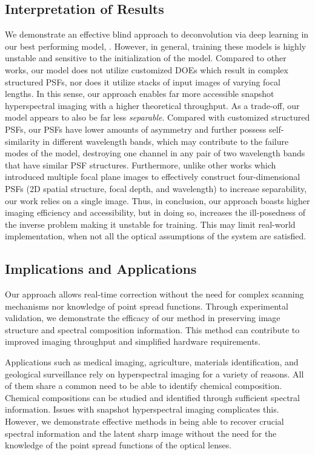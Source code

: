\documentclass{article}
\begin{document}
\subsection{Interpretation of Results}
We demonstrate an effective blind approach to deconvolution via deep learning in our best performing model, . However, in general, training these models is highly unstable and sensitive to the initialization of the model. Compared to other works, our model does not utilize customized DOEs which result in complex structured PSFs, nor does it utilize stacks of input images of varying focal lengths. In this sense, our approach enables far more accessible snapshot hyperspectral imaging with a higher theoretical throughput. As a trade-off, our model appears to also be far less \textit{separable}. Compared with customized structured PSFs, our PSFs have lower amounts of asymmetry and further possess self-similarity in different wavelength bands, which may contribute to the failure modes of the model, destroying one channel in any pair of two wavelength bands that have similar PSF structures. Furthermore, unlike other works which introduced multiple focal plane images to effectively construct four-dimensional PSFs (2D spatial structure, focal depth, and wavelength) to increase separability, our work relies on a single image. Thus, in conclusion, our approach boasts higher imaging efficiency and accessibility, but in doing so, increases the ill-posedness of the inverse problem making it unstable for training. This may limit real-world implementation, when not all the optical assumptions of the system are satisfied.

\subsection{Implications and Applications}
Our approach allows real-time correction without the need for complex scanning mechanisms nor knowledge of point spread functions. Through experimental validation, we demonstrate the efficacy of our method in preserving image structure and spectral composition information. This method can contribute to improved imaging throughput and simplified hardware requirements.

Applications such as medical imaging, agriculture, materials identification, and geological surveillance rely on hyperspectral imaging for a variety of reasons. All of them share a common need to be able to identify chemical composition. Chemical compositions can be studied and identified through sufficient spectral information. Issues with snapshot hyperspectral imaging complicates this. However, we demonstrate effective methods in being able to recover crucial spectral information and the latent sharp image without the need for the knowledge of the point spread functions of the optical lenses.
\end{document}
